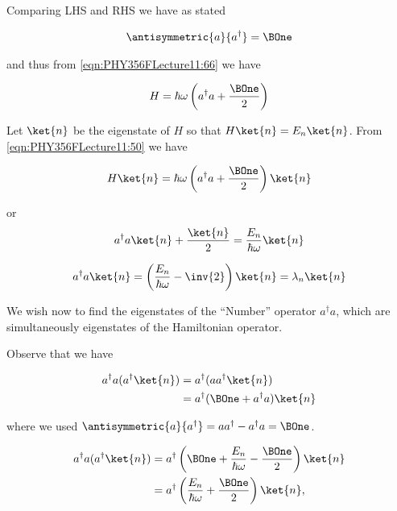 Comparing LHS and RHS we have as stated

\begin{align}\label{eqn:PHY356FLecture11:40}
\antisymmetric{a}{a^\dagger} = \BOne
\end{align}

and thus from \ref{eqn:PHY356FLecture11:66} we have

\begin{equation}\label{eqn:PHY356FLecture11:50}
H = \hbar \omega \left( a^\dagger a + \frac{\BOne}{2} \right)
\end{equation}

Let $\ket{n}$ be the eigenstate of $H$ so that $H\ket{n} = E_n \ket{n}$.  From \ref{eqn:PHY356FLecture11:50} we have

\begin{equation}\label{eqn:PHY356FLecture11:60}
H \ket{n}
=
\hbar \omega \left( a^\dagger a + \frac{\BOne}{2} \right) \ket{n}
\end{equation}

or
\begin{equation}\label{eqn:PHY356FLecture11:70}
a^\dagger a \ket{n} + \frac{\ket{n}}{2} = \frac{E_n}{\hbar \omega} \ket{n}
\end{equation}

\begin{equation}\label{eqn:PHY356FLecture11:80}
a^\dagger a \ket{n} = \left( \frac{E_n}{\hbar \omega} - \inv{2} \right) \ket{n} = \lambda_n \ket{n}
\end{equation}

We wish now to find the eigenstates of the ``Number'' operator $a^\dagger a$, which are simultaneously eigenstates of the Hamiltonian operator.

Observe that we have

\begin{align*}
a^\dagger a (a^\dagger \ket{n} )
&= a^\dagger ( a a^\dagger \ket{n} ) \\
&= a^\dagger ( \BOne + a^\dagger a ) \ket{n}
\end{align*}

where we used $\antisymmetric{a}{a^\dagger} = a a^\dagger - a^\dagger a = \BOne$.

\begin{align*}
a^\dagger a (a^\dagger \ket{n} )
&= a^\dagger \left( \BOne + \frac{E_n}{\hbar\omega} - \frac{\BOne}{2} \right) \ket{n} \\
&= a^\dagger \left( \frac{E_n}{\hbar\omega} + \frac{\BOne}{2} \right) \ket{n},
\end{align*}

